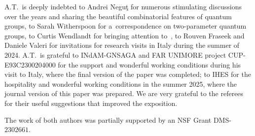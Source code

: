 \documentclass[pdftex]{sigma}
\numberwithin{equation}{section}
\begin{document}
A.T.\ is deeply indebted to Andrei Negu\c{t} for numerous stimulating discussions over the years and sharing the beautiful combinatorial features of quantum groups, to Sarah Witherspoon for a~correspondence on two-parameter quantum groups, to Curtis Wendlandt for bringing attention to~\cite{HM}, to Rouven Fraseek and Daniele Valeri for invitations for research visits in Italy during the summer of 2024.
A.T.\ is grateful to INdAM-GNSAGA and FAR UNIMORE project CUP-E93C2300204000 for the support and wonderful working conditions during his visit to Italy, where the final version of the paper was completed; to IHES for the hospitality and wonderful working conditions in the summer 2025, where the journal version of this paper was prepared. We are very grateful to the referees for their useful suggestions that improved the exposition.

The work of both authors was partially supported by an NSF Grant DMS-$2302661$.
\end{document}
